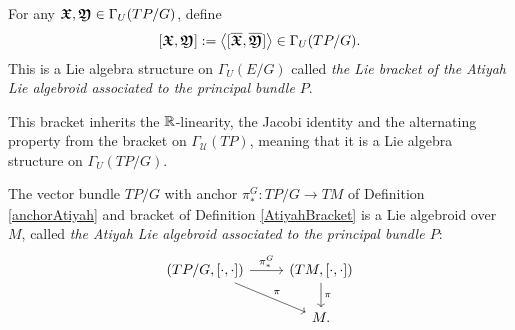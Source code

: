 \begin{definition}\label{AtiyahBracket}
For any $\bm{\mathfrak{X}}, \bm{\mathfrak{Y}} \in \Gamma_U(TP/G)$, define 
\begin{align} \label{bracketDefn}
    [\bm{\mathfrak{X}}, \bm{\mathfrak{Y}}] := \left\langle [\overline{\bm{\bm{\mathfrak{X}}}}, \overline{\bm{\bm{\mathfrak{Y}}}}] \right\rangle \in \Gamma_U(TP/G).
\end{align}
This is a Lie algebra structure on $\Gamma_U(E/G)$ called \emph{the Lie bracket of the Atiyah Lie algebroid associated to the principal bundle $P$}.
\end{definition}

This bracket inherits the $\mathbb{R}$-linearity, the Jacobi identity and the alternating property from the bracket on $\Gamma_{\mathcal U}(TP)$, meaning that it is a Lie algebra structure on $\Gamma_U(TP/G)$.

\begin{theorem}
The vector bundle $TP/G$ with anchor $\pi_*^G:TP/G \to TM$ of Definition \ref{anchorAtiyah} and bracket of Definition \ref{AtiyahBracket} is a Lie algebroid over $M$, called \emph{the Atiyah Lie algebroid associated to the principal bundle $P$}:
\begin{equation}
    \begin{tikzcd}
    (TP/G, [\cdot, \cdot]) \arrow{r}{\pi^G_*} \arrow{dr}{\pi} & (TM, [\cdot, \cdot]) \arrow{d}{\pi}\\
    & M.
    \end{tikzcd}
\end{equation}
\end{theorem}


